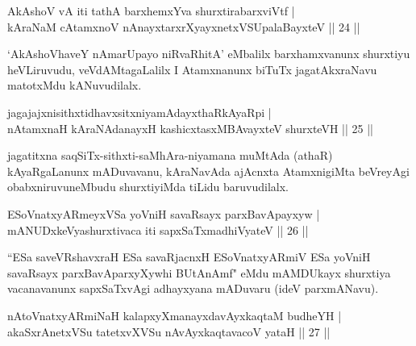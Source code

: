 
\begin{shl}
AkAshoV vA iti tathA barxhemxYva shurxtirabarxviVtf |\\
kAraNaM cA\s \s tamxnoV nAnayxtarxrXyayxnetxVSUpalaBayxteV \hfill || 24 ||
\end{shl}

\begin{artha}
`AkAshoVhaveY nAmarUpayo niRvaRhitA' eMbalilx barxhamxvanunx shurxtiyu heVLiruvudu, veVdAMtagaLalilx I Atamxnanunx biTuTx jagatAkxraNavu matotxMdu kANuvudilalx.
\end{artha}


\begin{shl}
jagajajxnisithxtidhavxsitxniyamAdayxthaRkAyaRpi |\\
nA\s \s tamxnaH kAraNAdanayxH kashicxtasxMBAvayxteV shurxteVH \hfill || 25 ||
\end{shl}

\begin{artha}
jagatitxna saqSiTx-sithxti-saMhAra-niyamana muMtAda (athaR) kAyaRgaLanunx mADuvavanu, kAraNavAda ajAcnxta AtamxnigiMta beVreyAgi obabxniruvuneMbudu shurxtiyiMda tiLidu baruvudilalx.
\end{artha}


\begin{shl}
ESoV\s natxyARmeyxVSa yoVniH savaRsayx parxBavApayxyw |\\
mANUDxkeVyashurxtivaca iti sapxSaTxmadhiVyateV \hfill || 26 ||
\end{shl}

\begin{artha}
``ESa saveVRshavxraH ESa savaRjacnxH ESoV\s natxyARmiV ESa yoVniH savaRsayx parxBavAparxyXywhi BUtAnAmf" eMdu mAMDUkayx shurxtiya vacanavanunx sapxSaTxvAgi adhayxyana mADuvaru (ideV parxmANavu).
\end{artha}

\begin{shl}
nAtoV\s natxyARmiNaH kalapxyXmanayxdavAyxkaqtaM budheYH |\\
akaSxrAnetxVSu tatetxvXVSu nAvAyxkaqtavacoV yataH \hfill || 27 ||
\end{shl}

